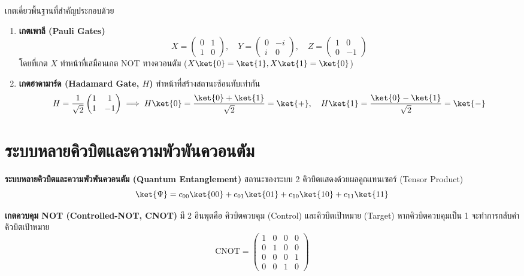 เกตเดี่ยวพื้นฐานที่สำคัญประกอบด้วย
\begin{enumerate}
    \item \textbf{เกตเพาลี (Pauli Gates)}
    \begin{equation}
    X = \begin{pmatrix} 0 & 1 \\ 1 & 0 \end{pmatrix}, \quad 
    Y = \begin{pmatrix} 0 & -i \\ i & 0 \end{pmatrix}, \quad 
    Z = \begin{pmatrix} 1 & 0 \\ 0 & -1 \end{pmatrix}
    \end{equation}
    โดยที่เกต $X$ ทำหน้าที่เสมือนเกต NOT ทางควอนตัม ($X\ket{0} = \ket{1}, X\ket{1} = \ket{0}$)
    \item \textbf{เกตฮาดามาร์ด (Hadamard Gate, $H$)} ทำหน้าที่สร้างสถานะซ้อนทับเท่ากัน
    \begin{equation}
    H = \frac{1}{\sqrt{2}} \begin{pmatrix} 1 & 1 \\ 1 & -1 \end{pmatrix} \implies H\ket{0} = \frac{\ket{0} + \ket{1}}{\sqrt{2}} = \ket{+}, \quad H\ket{1} = \frac{\ket{0} - \ket{1}}{\sqrt{2}} = \ket{-}
    \end{equation}
\end{enumerate}

\section{ระบบหลายคิวบิตและความพัวพันควอนตัม}

\textbf{ระบบหลายคิวบิตและความพัวพันควอนตัม (Quantum Entanglement)} สถานะของระบบ 2 คิวบิตแสดงด้วยผลคูณเทนเซอร์ (Tensor Product)
\begin{equation}
\ket{\Psi} = c_{00} \ket{00} + c_{01} \ket{01} + c_{10} \ket{10} + c_{11} \ket{11}
\end{equation}

\textbf{เกตควบคุม NOT (Controlled-NOT, CNOT)} มี 2 อินพุตคือ คิวบิตควบคุม (Control) และคิวบิตเป้าหมาย (Target) หากคิวบิตควบคุมเป็น 1 จะทำการกลับค่าคิวบิตเป้าหมาย
\begin{equation}
\text{CNOT} = \begin{pmatrix} 1 & 0 & 0 & 0 \\ 0 & 1 & 0 & 0 \\ 0 & 0 & 0 & 1 \\ 0 & 0 & 1 & 0 \end{pmatrix}
\end{equation}

